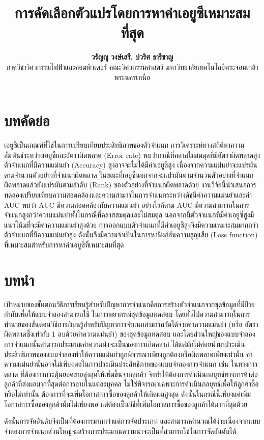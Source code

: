 \documentclass[twoside, twocolumn, 12pt]{article}
\title{\textbf{การคัดเลือกตัวแปรโดยการหาค่าเอยูซีเหมาะสมที่สุด}}
\author{%
\textbf{วรัญญู วงษ์เสรี, ปวริศ ธารีชาญ}\\[1ex]
ภาควิชาวิศวกรรมไฟฟ้าและคอมพิวเตอร์ คณะวิศวกรรมศาสตร์ มหาวิทยาลัยเทคโนโลยีพระจอมเกล้าพระนครเหนือ %
}
\date{}
\begin{document}
\maketitle
\section*{บทคัดย่อ}
\quad เอยูซีเป็นเกณฑ์ที่ใช้ในการเปรียบเทียบประสิทธิภาพของตัวจำแนก การวิเคราะห์ทางสถิติหาความสัมพันธ์ระหว่างเอยูซีและอัตราผิดพลาด (Error rate) พบว่ากรณีที่คลาสไม่สมดุลที่มีอัตราผิดพลาดสูง ตัวจำแนกที่มีความแม่นยำ (Accuracy) สูงอาจจะไม่ได้มีค่าเอยูซีสูง เนื่องจากความแม่นยำจะแปรผันตามจำนวนตัวอย่างที่จำแนกผิดพลาด ในขณะที่เอยูซีนอกจากจะแปรผันตามจำนวนตัวอย่างที่จำแนกผิดพลาดแล้วยังแปรผันตามลำดับ (Rank) ของตัวอย่างที่จำแนกผิดพลาดด้วย งานวิจัยนี้นำเสนอการทดลองเปรียบเทียบความสอดคล้องและความสามารในการจำแนกระหว่างดัชนีค่าความแม่นยำและค่า AUC พบว่า AUC มีความสอดคล้องกับความแม่นยำ อย่างไรก้ตาม AUC มีความสามารถในการจำแนกสูงกว่าความแม่นยำทั้งในกรณีที่คลาสสมดุลและไม่สมดุล นอกจากนี้ตัวจำแนกที่มีค่าเอยูซีสูงมีแนวโน้มที่จะมีค่าความแม่นยำสูงด้วย การออกแบบตัวจำแนกที่มีค่าเอยูซีสูงจึงมีความเหมาะสมมากกว่าตัวจำแนกที่มีความแม่นยำสูง ดังนั้นจึงมีความจำเป็นในการหาฟังก์ชันความสูญเสีย (Loss function) ที่เหมาะสมสำหรับการหาค่าเอยูซีที่เหมาะสมที่สุด
\section{บทนำ}
เป้าหมายของขั้นตอนวิธีการเรียนรู้สำหรับปัญหาการจำแนกคือการสร้างตัวจำแนกจากชุดข้อมูลที่มีป้ายกำกับเพื่อให้แบบจำลองสามารถใช้ ในการพยากรณ์ชุดข้อมูลทดสอบ โดยทั่วไปความสามารถในการทำนายของขั้นตอนวิธีการเรียนรู้สำหรับปัญหาการจำแนกสามารถวัดได้จากค่าความแม่นยำ (หรือ อัตราผิดพลาดซึ่งเท่ากับ 1 ลบด้วยค่าความแม่นยำ) ของชุดข้อมูลทดสอบ และโดยส่วนใหญ่ของแบบจำลองการจำแนกนั้นสามารถประมาณค่าความน่าจะเป็นของการเกิดคลาส ได้แต่มักไม่ค่อยนำมาประเมินประสิทธิภาพของแบบจำลองทำให้ความแม่นยำถูกพิจารณาเพียงถูกต้องหรือผิดพลาดเพียงเท่านั้น 
ค่าความแม่นยำนั้นอาจไม่เพียงพอในการประเมินประสิทธิภาพของแบบจำลองการจำแนก เช่น ในทางการตลาด ที่ต้องการกระตุ้นยอดขายสูงสุดให้เพิ่มขึ้นจากลูกค้า จึงทำให้ต้องการดําเนินกลยุทธ์ทางการค้าต่อลูกค้าที่ส่งผลมากที่สุดต่อการขายในแต่ละบุคคล ไม่ใช่พิจารณาเฉพาะการดำเนินกลยุทธ์เพื่อให้ลูกค้าซื้อหรือไม่เท่านั้น ต้องการที่จะเพิ่มโอกาสการซื้อของลูกค้าให้เกิดผลสูงสุด ดังนั้นในกรณีนี้เพียงแค่เพิ่มโอกาสการซื้อของลูกค้านั้นไม่เพียงพอ แต่ต้องเป็นวิธีที่เพิ่มโอกาสการซื้อของลูกค้าได้มากที่สุดด้วย\cite{1}

ดังนั้นการจัดอันดับจึงเป็นที่ต้องการมากกว่าแค่การจัดประเภท และสามารถคำนวณได้ง่ายเนื่องจากแบบจำลองการจำแนกส่วนใหญ่จะสร้างการประมาณความน่าจะเป็นที่สามารถใช้ในการจัดอันดับได้
\end{document}
